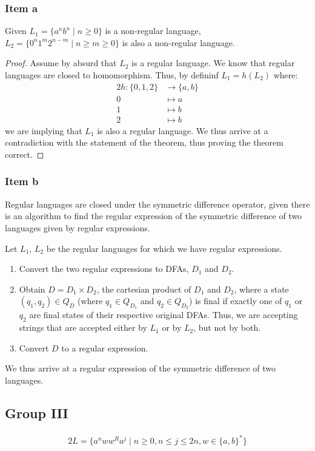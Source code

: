 {\subsubsection{Item a}
\begin{theorem}
	Given $L_1=\{a^n b^n \mid n \geq 0\}$ is a non-regular language, $L_2=\{0^n 1^m 2^{n-m} \mid  n \geq m \geq 0\}$ is also a non-regular language.
\end{theorem}
\begin{proof}
	Assume by absurd that $L_2$ is a regular language. We know that regular languages are closed to homomorphism. Thus, by defininf $L_1=h(L_2)$ where:
	\begin{alignat*}{2}
		h \colon \{0,1,2\} &\rightarrow \{a,b\}\\
		0                  &\mapsto a\\
		1                  &\mapsto b\\
		2                  &\mapsto b
	\end{alignat*}
	we are implying that $L_1$ is also a regular language. We thus arrive at a contradiction with the statement of the theorem, thus proving the theorem correct.
\end{proof}
\subsubsection{Item b}
Regular languages are closed under the symmetric difference operator, given there is an algorithm to find the regular expression of the symmetric difference of two languages given by regular expressions.\par
Let $L_1$, $L_2$ be the regular languages for which we have regular expressions.
\begin{enumerate}
	\item Convert the two regular expressions to DFAs, $D_1$ and $D_2$.
	\item Obtain $D=D_1 \times D_2$, the cartesian product of $D_1$ and $D_2$, where a state $(q_1,q_2)\in Q_D$ (where $q_1 \in Q_{D_1}$ and $q_2 \in Q_{D_2}$) is final if exactly one of $q_1$ or $q_2$ are final states of their respective original DFAs. Thus, we are accepting strings that are accepted either by $L_1$ or by $L_2$, but not by both.
	\item Convert $D$ to a regular expression.
\end{enumerate}
We thus arrive at a regular expression of the symmetric difference of two languages.
\pagebreak
\subsection{Group III}
\begin{alignat*}{2}
	L=\{a^n w w^R a^j \mid n \geq 0, n \leq j \leq 2n, w \in \{a,b\}^*\}
\end{alignat*}
}
